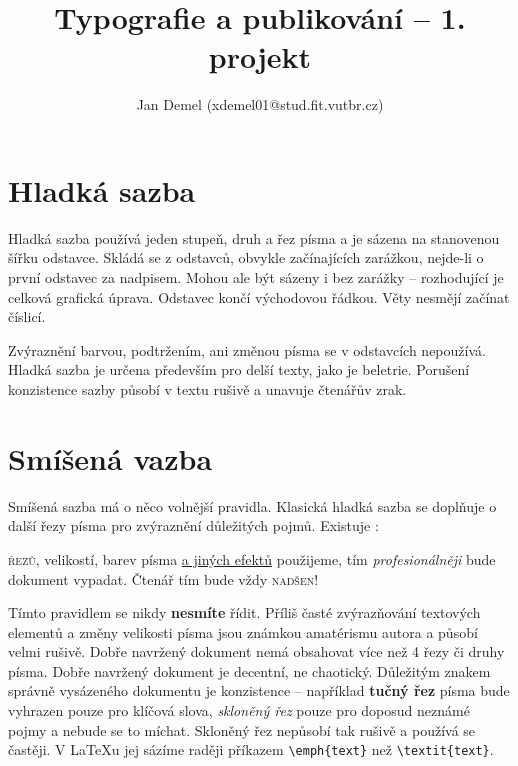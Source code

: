 \documentclass[twocolumn]{article}
\title{Typografie a publikování – 1. projekt}
\author{Jan Demel (xdemel01@stud.fit.vutbr.cz)}
\date{}
\begin{document}
    \maketitle
    
    \section{Hladká sazba}
    Hladká sazba používá jeden stupeň, druh a řez písma
    a je sázena na stanovenou šířku odstavce. Skládá
    se z odstavců, obvykle začínajících zarážkou, nejde-li
    o první odstavec za nadpisem. Mohou ale být sázeny
    i bez zarážky – rozhodující je celková grafická úprava.
    Odstavec končí východovou řádkou. Věty nesmějí začínat číslicí.
    \par
    Zvýraznění barvou, podtržením, ani změnou písma
    se v odstavcích nepoužívá. Hladká sazba je určena především pro delší texty, jako je beletrie. Porušení konzistence sazby působí v textu rušivě a unavuje čtenářův
    zrak.
    
    \section{Smíšená vazba}
    Smíšená sazba má o něco volnější pravidla. Klasická
    hladká sazba se doplňuje o další řezy písma pro zvýraznění důležitých pojmů. Existuje :
    \bigskip{}
    \par
    
    \begin{adjustwidth}{0.6cm}{1cm}
     \textsc{řezů}, {\scriptsize velikostí,} barev
    písma \underline{a jiných efektů} použijeme, tím {\large \emph{profesionálněji}} bude dokument vypadat. Čtenář
    tím bude vždy \textsc{nadšen}!
    \end{adjustwidth}
    \par
    \bigskip{}
    
    
    {\small Tímto} pravidlem se nikdy \textbf{nesmíte} řídit. Příliš časté
    {\large zvýrazňování} textových elementů a změny velikosti
    {\huge písma} jsou známkou amatérismu autora a působí
    {\Huge velmi} rušivě. Dobře navržený dokument nemá
    obsahovat více než 4 řezy či druhy písma. Dobře navržený dokument je decentní, ne chaotický.
    Důležitým znakem správně vysázeného dokumentu
    je konzistence – například \textbf{tučný řez} písma bude vyhrazen pouze pro klíčová slova, \emph{skloněný řez} pouze
    pro doposud neznámé pojmy a nebude se to míchat.
    Skloněný řez nepůsobí tak rušivě a používá se častěji.
    V \LaTeX u jej sázíme raději příkazem \verb|\emph{text}| než
    \verb|\textit{text}|.
    
\end{document}
